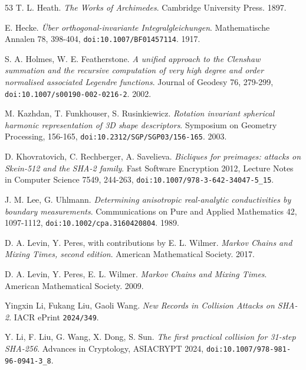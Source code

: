 \begin{thebibliography}{53}
T. L. Heath. \emph{The Works of Archimedes}. Cambridge University Press. 1897.

E. Hecke. \emph{Über orthogonal-invariante Integralgleichungen}. Mathematische Annalen 78, 398-404, \texttt{doi:10.1007/\allowbreak{}BF01457114}. 1917.

S. A. Holmes, W. E. Featherstone. \emph{A unified approach to the Clenshaw summation and the recursive computation of very high degree and order normalised associated Legendre functions}. Journal of Geodesy 76, 279-299, \texttt{doi:10.1007/\allowbreak{}s00190-002-0216-2}. 2002.

M. Kazhdan, T. Funkhouser, S. Rusinkiewicz. \emph{Rotation invariant spherical harmonic representation of 3D shape descriptors}. Symposium on Geometry Processing, 156-165, \texttt{doi:10.2312/\allowbreak{}SGP/\allowbreak{}SGP03/\allowbreak{}156-165}. 2003.

D. Khovratovich, C. Rechberger, A. Savelieva. \emph{Bicliques for preimages: attacks on Skein-512 and the SHA-2 family}. Fast Software Encryption 2012, Lecture Notes in Computer Science 7549, 244-263, \texttt{doi:10.1007/\allowbreak{}978-3-642-34047-5\_\allowbreak{}15}.

J. M. Lee, G. Uhlmann. \emph{Determining anisotropic real-analytic conductivities by boundary measurements}. Communications on Pure and Applied Mathematics 42, 1097-1112, \texttt{doi:10.1002/\allowbreak{}cpa.3160420804}. 1989.

D. A. Levin, Y. Peres, with contributions by E. L. Wilmer. \emph{Markov Chains and Mixing Times, second edition}. American Mathematical Society. 2017.

D. A. Levin, Y. Peres, E. L. Wilmer. \emph{Markov Chains and Mixing Times}. American Mathematical Society. 2009.

Yingxin Li, Fukang Liu, Gaoli Wang. \emph{New Records in Collision Attacks on SHA-2}. IACR ePrint \texttt{2024/\allowbreak{}349}.

Y. Li, F. Liu, G. Wang, X. Dong, S. Sun. \emph{The first practical collision for 31-step SHA-256}. Advances in Cryptology, ASIACRYPT 2024, \texttt{doi:10.1007/\allowbreak{}978-981-96-0941-3\_\allowbreak{}8}.


\end{thebibliography}
